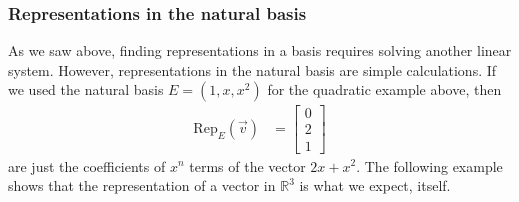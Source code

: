 \subsubsection{Representations in the natural basis}

As we saw above, finding representations in a basis requires solving another linear system.  However, representations in the natural basis are simple calculations.  If we used the natural basis $E=( 1, x, x^2 )$ for the quadratic example above, then 
%
\begin{align*}
\text{Rep}_E (\vec{v}) & = \begin{bmatrix}
0 \\ 2 \\ 1
\end{bmatrix}
\end{align*}
are just the coefficients of $x^n$ terms of the vector $2x+x^2$.   The following example shows that the representation of a vector in $\mathbb{R}^3$ is what we expect, itself. 

\vspace{0.5in}

~ 

